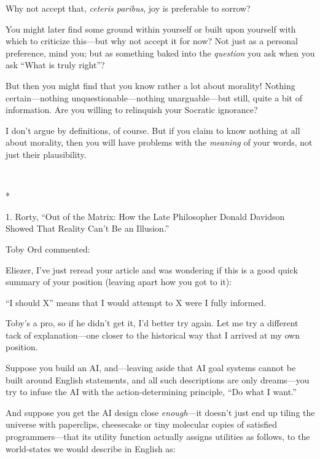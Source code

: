 {
 Why not accept that, \textit{ceteris paribus}, joy is preferable
to sorrow?}

{
 You might later find some ground within yourself or built upon
yourself with which to criticize this---but why not accept it for now?
Not just as a personal preference, mind you; but as something baked
into the \textit{question} you ask when you ask ``What
is truly right''?}

{
 But then you might find that you know rather a lot about morality!
Nothing certain---nothing unquestionable---nothing unarguable---but
still, quite a bit of information. Are you willing to relinquish your
Socratic ignorance?}

{
 I don't argue by definitions, of course. But if
you claim to know nothing at all about morality, then you will have
problems with the \textit{meaning} of your words, not just their
plausibility.}

{\centering
 \ ~
\par}

{\centering
 *
\par}


\bigskip

{
 1. Rorty, ``Out of the Matrix: How the Late
Philosopher Donald Davidson Showed That Reality Can't
Be an Illusion.''}


{
 Toby Ord commented:}

{
 Eliezer, I've just reread your article and was
wondering if this is a good quick summary of your position (leaving
apart how you got to it):}

{
 ``I should X'' means that I
would attempt to X were I fully informed.}

{
 Toby's a pro, so if he didn't get
it, I'd better try again. Let me try a different tack
of explanation---one closer to the historical way that I arrived at my
own position.}

{
 Suppose you build an AI, and---leaving aside that AI goal systems
cannot be built around English statements, and all such descriptions
are only dreams---you try to infuse the AI with the action-determining
principle, ``Do what I want.''}

{
 And suppose you get the AI design close \textit{enough}{}---it
doesn't just end up tiling the universe with
paperclips, cheesecake or tiny molecular copies of satisfied
programmers---that its utility function actually assigns utilities as
follows, to the world-states we would describe in English as:}

